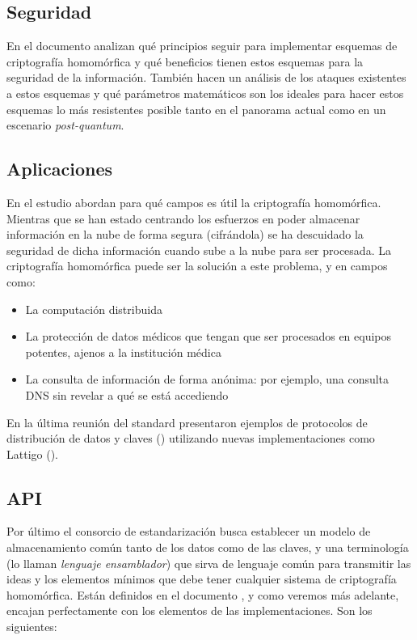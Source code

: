 \subsection{Seguridad}

En el documento \cite{chase_security_2017} analizan qué principios seguir para implementar esquemas de criptografía homomórfica y qué beneficios tienen estos esquemas para la seguridad de la información. También hacen un análisis de los ataques existentes a estos esquemas y qué parámetros matemáticos son los ideales para hacer estos esquemas lo más resistentes posible tanto en el panorama actual como en un escenario \textit{post-quantum}.

\subsection{Aplicaciones}

En el estudio \cite{archer_applications_2017} abordan para qué campos es útil la criptografía homomórfica. Mientras que se han estado centrando los esfuerzos en poder almacenar información en la nube de forma segura (cifrándola) se ha descuidado la seguridad de dicha información cuando sube a la nube para ser procesada. La criptografía homomórfica puede ser la solución a este problema, y en campos como:

\begin{itemize}
    \item La computación distribuida
    \item La protección de datos médicos que tengan que ser procesados en equipos potentes, ajenos a la institución médica
    \item La consulta de información de forma anónima: por ejemplo, una consulta DNS sin revelar a qué se está accediendo
\end{itemize}

En la última reunión del standard presentaron ejemplos de protocolos de distribución de datos y claves (\cite{troncoso-pastoriza_homomorphic_nodate}) utilizando nuevas implementaciones como Lattigo (\cite{noauthor_lattigo_2019}).

\subsection{API}

Por último el consorcio de estandarización busca establecer un modelo de almacenamiento común tanto de los datos como de las claves, y una terminología (lo llaman \textit{lenguaje ensamblador}) que sirva de lenguaje común para transmitir las ideas y los elementos mínimos que debe tener cualquier sistema de criptografía homomórfica. Están definidos en el documento \cite{brenner_standard_2017}, y como veremos más adelante, encajan perfectamente con los elementos de las implementaciones. Son los siguientes:

